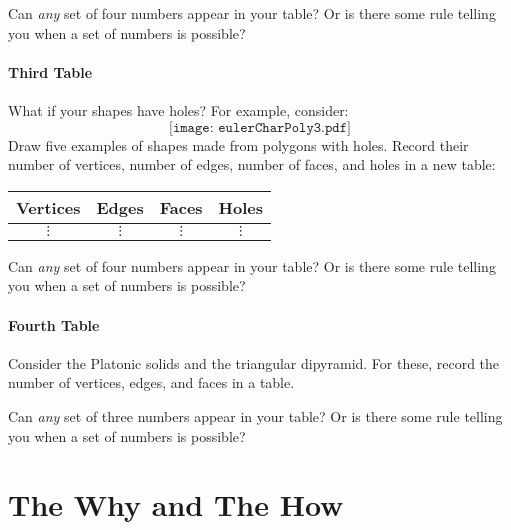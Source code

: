 \documentclass{ximera}
\begin{document}
\begin{question}
Can \textit{any} set of four  numbers appear in your table? Or is
there some rule telling you when a set of numbers is possible? 
\end{question}


\paragraph{Third Table}


\begin{question}
What if your shapes have holes? For example, consider:
\[
\texttt{[image: eulerCharPoly3.pdf]}
\]
Draw five examples of shapes made from polygons with holes. Record
their number of vertices, number of edges, number of faces, and holes in a new
table:
\begin{center}
\begin{tabular}{c|c|c|c}
Vertices & Edges & Faces & Holes\\
\hline\hline
 $\vdots$  & $\vdots$  & $\vdots$  & $\vdots$  \\ 
\end{tabular}
\end{center}
\end{question}

\begin{question}
Can \textit{any} set of four numbers appear in your table? Or is
there some rule telling you when a set of numbers is possible? 
\end{question}


\paragraph{Fourth Table}

\begin{question}
Consider the Platonic solids and the triangular dipyramid. For these,
record the number of vertices, edges, and faces in a table.
\end{question}


\begin{question}
Can \textit{any} set of three numbers appear in your table? Or is
there some rule telling you when a set of numbers is possible? 
\end{question}



\section*{The Why and The How}
\end{document}
